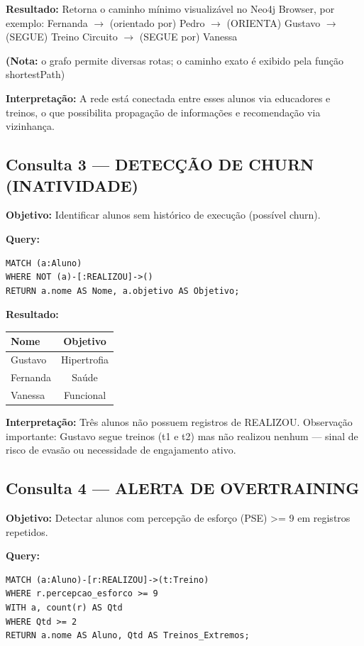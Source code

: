 \documentclass[12pt,a4paper]{article}
\begin{document}
\textbf{Resultado:} Retorna o caminho mínimo visualizável no Neo4j Browser, por exemplo: Fernanda $\rightarrow$ (orientado por) Pedro $\rightarrow$ (ORIENTA) Gustavo $\rightarrow$ (SEGUE) Treino Circuito $\rightarrow$ (SEGUE por) Vanessa

\textbf{(Nota:} o grafo permite diversas rotas; o caminho exato é exibido pela função shortestPath)

\textbf{Interpretação:} A rede está conectada entre esses alunos via educadores e treinos, o que possibilita propagação de informações e recomendação via vizinhança.

\subsection{Consulta 3 — DETECÇÃO DE CHURN (INATIVIDADE)}

\textbf{Objetivo:} Identificar alunos sem histórico de execução (possível churn).

\textbf{Query:}
\lstset{caption=Consulta 3 - Detecção de Churn}
\begin{lstlisting}
MATCH (a:Aluno)
WHERE NOT (a)-[:REALIZOU]->()
RETURN a.nome AS Nome, a.objetivo AS Objetivo;
\end{lstlisting}

\textbf{Resultado:}
\begin{table}[h]
\centering
\begin{tabular}{lc}
\toprule
Nome & Objetivo \\
\midrule
Gustavo & Hipertrofia \\
Fernanda & Saúde \\
Vanessa & Funcional \\
\bottomrule
\end{tabular}
\end{table}

\textbf{Interpretação:} Três alunos não possuem registros de REALIZOU. Observação importante: Gustavo segue treinos (t1 e t2) mas não realizou nenhum — sinal de risco de evasão ou necessidade de engajamento ativo.


\subsection{Consulta 4 — ALERTA DE OVERTRAINING}

\textbf{Objetivo:} Detectar alunos com percepção de esforço (PSE) >= 9 em registros repetidos.

\textbf{Query:}
\lstset{caption=Consulta 4 - Alerta de Overtraining}
\begin{lstlisting}
MATCH (a:Aluno)-[r:REALIZOU]->(t:Treino)
WHERE r.percepcao_esforco >= 9
WITH a, count(r) AS Qtd
WHERE Qtd >= 2
RETURN a.nome AS Aluno, Qtd AS Treinos_Extremos;
\end{lstlisting}
\end{document}
